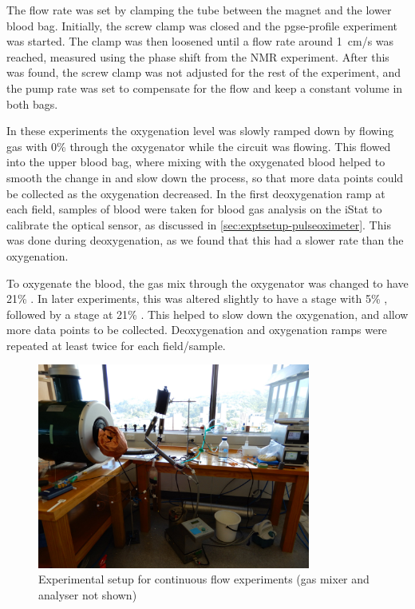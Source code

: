 The flow rate was set by clamping the tube between the magnet and the lower blood bag.
Initially, the screw clamp was closed and the pgse-profile experiment was started.
The clamp was then loosened until a flow rate around \SI{1}{cm/s} was reached, measured using the phase shift from the NMR experiment.
After this was found, the screw clamp was not adjusted for the rest of the experiment, and the pump rate was set to compensate for the flow and keep a constant volume in both bags.

In these experiments the oxygenation level was slowly ramped down by flowing gas with 0\% \Otwo through the oxygenator while the circuit was flowing.
This flowed into the upper blood bag, where mixing with the oxygenated blood helped to smooth the change in \SOtwo and slow down the process, so that more data points could be collected as the oxygenation decreased.
In the first deoxygenation ramp at each field, samples of blood were taken for blood gas analysis on the iStat to calibrate the optical sensor, as discussed in \autoref{sec:exptsetup-pulseoximeter}.
This was done during deoxygenation, as we found that this had a slower rate than the oxygenation.

To oxygenate the blood, the gas mix through the oxygenator was changed to have 21\% \Otwo.
In later experiments, this was altered slightly to have a stage with 5\% \Otwo, followed by a stage at 21\% \Otwo.
This helped to slow down the oxygenation, and allow more data points to be collected.
Deoxygenation and oxygenation ramps were repeated at least twice for each field/sample.

\begin{figure}[t]
\centering
\includegraphics[width=0.8\textwidth]{figures/contflow/contflowlabpic.jpg}
\caption{Experimental setup for continuous flow experiments (gas mixer and analyser not shown)}
\label{fig:contflow-labpic}
\end{figure}

